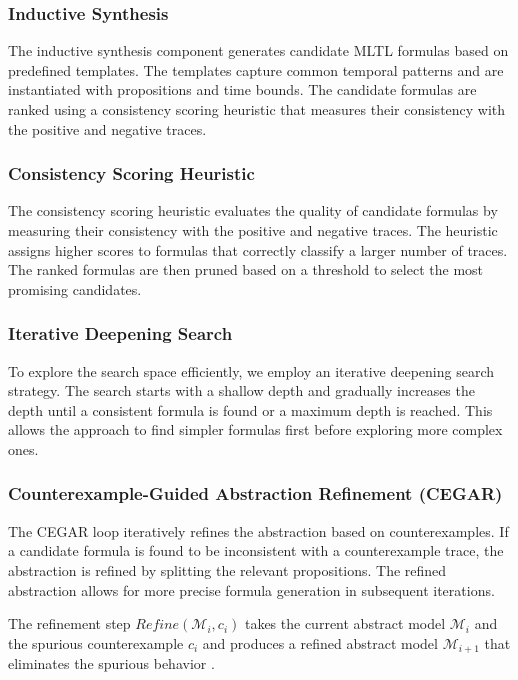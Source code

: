 \documentclass[runningheads]{llncs}
\begin{document}
\subsubsection{Inductive Synthesis}
The inductive synthesis component generates candidate MLTL formulas based on predefined templates. The templates capture common temporal patterns and are instantiated with propositions and time bounds. The candidate formulas are ranked using a consistency scoring heuristic that measures their consistency with the positive and negative traces.

\subsubsection{Consistency Scoring Heuristic}
The consistency scoring heuristic evaluates the quality of candidate formulas by measuring their consistency with the positive and negative traces. The heuristic assigns higher scores to formulas that correctly classify a larger number of traces. The ranked formulas are then pruned based on a threshold to select the most promising candidates.

\subsubsection{Iterative Deepening Search}
To explore the search space efficiently, we employ an iterative deepening search strategy. The search starts with a shallow depth and gradually increases the depth until a consistent formula is found or a maximum depth is reached. This allows the approach to find simpler formulas first before exploring more complex ones.

\subsubsection{Counterexample-Guided Abstraction Refinement (CEGAR)}
The CEGAR loop iteratively refines the abstraction based on counterexamples. If a candidate formula is found to be inconsistent with a counterexample trace, the abstraction is refined by splitting the relevant propositions. The refined abstraction allows for more precise formula generation in subsequent iterations.

The refinement step $Refine(\mathcal{M}_i, c_i)$ takes the current abstract model $\mathcal{M}_i$ and the spurious counterexample $c_i$ and produces a refined abstract model $\mathcal{M}_{i+1}$ that eliminates the spurious behavior \cite{cegar10.1007/10722167_15}.
\end{document}
